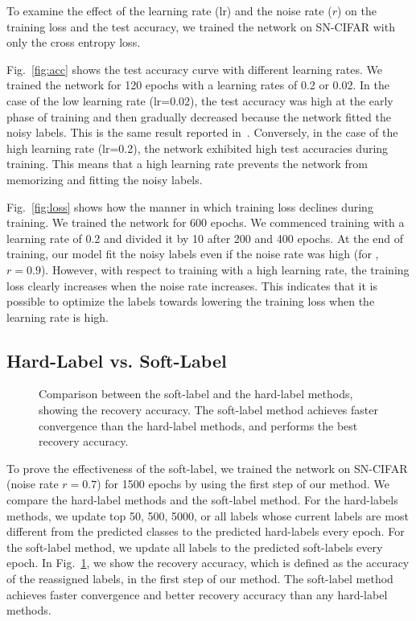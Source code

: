 \documentclass[10pt,twocolumn,letterpaper]{article}
\newcommand{\Fref}[1]{Fig.~\ref{#1}}
\begin{document}
To examine the effect of the learning rate (lr) and the noise rate ($r$) on the training loss and the test accuracy, we trained the network on SN-CIFAR with only the cross entropy loss.

\Fref{fig:acc} shows the test accuracy curve with different learning rates. We trained the network for 120 epochs with a learning rates of 0.2 or 0.02. In the case of the low learning rate (lr=0.02), the test accuracy was high at the early phase of training and then gradually decreased because the network fitted the noisy labels. This is the same result reported in~\cite{arpit2017closer}. Conversely, in the case of the high learning rate (lr=0.2), the network exhibited high test accuracies during training. This means that a high learning rate prevents the network from memorizing and fitting the noisy labels.

\Fref{fig:loss} shows how the manner in which training loss declines during training. We trained the network for 600 epochs. We commenced training with a learning rate of 0.2 and divided it by 10 after 200 and 400 epochs. At the end of training, our model fit the noisy labels even if the noise rate was high (for \eg, $r=0.9$). However, with respect to training with a high learning rate, the training loss clearly increases when the noise rate increases. This indicates that it is possible to optimize the labels towards lowering the training loss when the learning rate is high.

\subsection{Hard-Label vs. Soft-Label}\label{sec:vs}
\begin{figure}[t]
  \vspace{-5mm}
  \centering
  \caption{Comparison between the soft-label and the hard-label methods, showing the recovery accuracy. The soft-label method achieves faster convergence than the hard-label methods, and performs the best recovery accuracy.}
  \label{fig:hard}
  \vspace{-5mm}
\end{figure}

To prove the effectiveness of the soft-label, we trained the network on SN-CIFAR (noise rate $r=0.7$) for 1500 epochs by using the first step of our method. We compare the hard-label methods and the soft-label method. For the hard-labels methods, we update top 50, 500, 5000, or all labels whose current labels are most different from the predicted classes to the predicted hard-labels every epoch. For the soft-label method, we update all labels to the predicted soft-labels every epoch.
In \Fref{fig:hard}, we show the recovery accuracy, which is defined as the accuracy of the reassigned labels, in the first step of our method. The soft-label method achieves faster convergence and better recovery accuracy than any hard-label methods.
\end{document}
